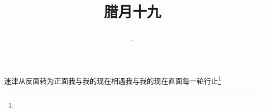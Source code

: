 \title{\date[d=29,m=1,y=2024][year:cn-y,年,month:cn,day:cn,日,·,weekday]·腊月十九 }
迷津从反面转为正面我与我的现在相遇我与我的现在直面每一轮行止\footnote{ }

